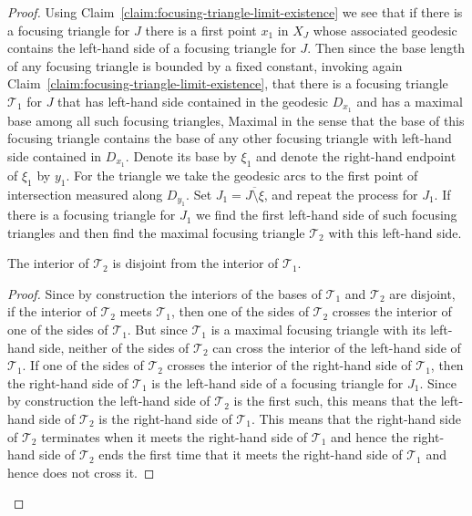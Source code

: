 \begin{proof}
Using Claim~\ref{claim:focusing-triangle-limit-existence} we see that if there is  a  focusing
triangle for $J$ there is a first point $x_1$ in $ X_J$ whose
associated geodesic contains the left-hand side of a focusing
triangle for $J$. Then since the base length of any focusing
triangle is bounded by a fixed constant, invoking again
Claim~\ref{claim:focusing-triangle-limit-existence}, that there is a focusing triangle ${\mathcal
T}_1$ for $J$ that has left-hand side contained in the geodesic
$D_{x_1}$ and has a maximal base among all such focusing triangles,
Maximal in the sense that the base of this focusing triangle
contains the base of any other focusing triangle with left-hand side
contained in $D_{x_1}$. Denote its base by $\xi_1$ and denote the
right-hand endpoint of $\xi_1$ by $y_1$. For the triangle we take
the geodesic arcs to the first point of intersection measured along
$D_{y_1}$. Set $J_1=\overline{J\setminus \xi}$, and repeat the
process for $J_1$. If there is a focusing triangle for $J_1$ we find
the first left-hand side of such focusing triangles and then find
the maximal focusing triangle ${\mathcal T}_2$ with this left-hand
side.

\begin{claim}
\label{claim:maximal-focusing-triangles-disjoint}
The interior of ${\mathcal T}_2$ is disjoint from the interior of
${\mathcal T}_1$.
\end{claim}

\begin{proof}
Since by construction the interiors of the bases of ${\mathcal T}_1$
and ${\mathcal T}_2$ are disjoint, if the interior of ${\mathcal
T}_2$ meets ${\mathcal T}_1$, then one of the sides of ${\mathcal
T}_2$ crosses the interior of one of the sides of ${\mathcal T}_1$.
But since ${\mathcal T}_1$ is a maximal focusing triangle with its
left-hand side, neither of the sides of ${\mathcal T}_2$ can cross
the interior of the left-hand side of ${\mathcal T}_1$. If one of
the sides of ${\mathcal T}_2$ crosses the interior of the right-hand
side of ${\mathcal T}_1$, then the right-hand side of ${\mathcal
T}_1$ is the left-hand side of a focusing triangle for $J_1$. Since
by construction the left-hand side of ${\mathcal T}_2$ is the first
such, this means that the left-hand side of ${\mathcal T}_2$ is the
right-hand side of ${\mathcal T}_1$. This means that the right-hand
side of ${\mathcal T}_2$ terminates when it meets the right-hand
side of ${\mathcal T}_1$ and hence the right-hand side of ${\mathcal
T}_2$ ends the first time that it meets the right-hand side of
${\mathcal T}_1$ and hence does not cross it.
\end{proof}


\end{proof}
